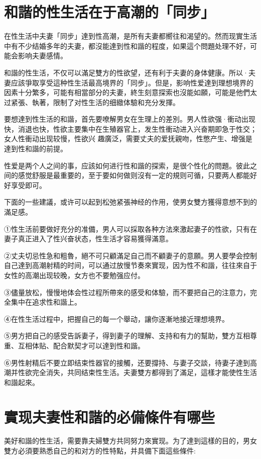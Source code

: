 \documentclass[12pt,UTF8]{ctexbook}
\begin{document}
\section{和諧的性生活在于高潮的「同步」}

在性生活中夫妻「同步」達到性高潮，是所有夫妻都嚮往和渴望的。然而现實生活中有不少结婚多年的夫妻，都沒能達到性和諧的程度，如果這个問題处理不好，可能会影响夫妻感情。

和諧的性生活，不仅可以滿足雙方的性欲望，还有利于夫妻的身体健康。所以·夫妻应該爭取享受這种性生活最高境界的「同步」。但是，影响性爱達到理想境界的因素十分繁多，可能有相當部分的夫妻，終生刻意探索也沒能如願，可能是他們太过紧張、執著，限制了对性生活的细緻体驗和充分发揮。

要想達到性生活的和諧，首先要嘹解男女在生理上的差別。男人性欲强·衝动出现快，消退也快，性欲主要集中在生殖器官上，发生性衝动进入兴奋期即急于性交；女人性衝动出现较慢，性欲兴
趣廣泛，需要丈夫的爱抚親吻，性憋产生、增强是達到性和諧的前提。

性爱是两个人之间的事，应該如何进行性和諧的探索，是很个性化的問題。彼此之间的感觉舒服是最重要的，至于要如何做则沒有一定的規则可循，只要两人都能好好享受即可。

下面的一些建議，或许可以起到松弛紧張神经的作用，使男女雙方獲得意想不到的滿足感。

①性生活前要做好充分的准備，男人可以採取各种方法來激起妻子的性欲，只有在妻子真正进入了性兴奋状态，性生活才容易獲得滿意。

②丈夫切忌性急和粗魯，絕不可只顧滿足自己而不顧妻子的意願。男人要學会控制自己達到高潮射精的时间，可以通过放慢节奏來實现，因为性不和諧，往往來自于女性的高潮出现较晚，女方也不要勉强应付。

③儘量放松，慢慢地体会性过程所帶來的感受和体驗，而不要把自己的注意力，完全集中在追求性和諧上。

④在性生活过程中，把握自己的每一个舉动，讓你逐漸地接近理想境界。

⑤男方把自己的感受告訴妻子，得到妻子的理解、支持和有力的幫助，雙方互相尊重、互相体贴、配合默契才可以達到性和諧。

⑥男性射精后不要立即结束性器官的接觸，还要撐持、与妻子交談，待妻子達到高潮并性欲完全消失，共同结束性生活。夫妻雙方都得到了滿足，這樣才能使性生活和諧起來。

\section{實现夫妻性和諧的必備條件有哪些}

美好和諧的性生活，需要靠夫婦雙方共同努力來實现。为了達到這樣的目的，男女雙方必須要熟悉自己的和对方的性特點，并具備下面這些條件:
\end{document}

